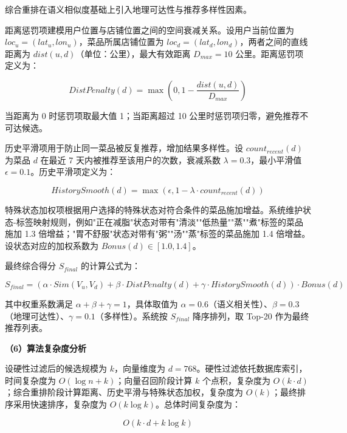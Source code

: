 综合重排在语义相似度基础上引入地理可达性与推荐多样性因素。

距离惩罚项建模用户位置与店铺位置之间的空间衰减关系。设用户当前位置为 $loc_u = (lat_u, lon_u)$，菜品所属店铺位置为 $loc_d = (lat_d, lon_d)$，两者之间的直线距离为 $dist(u, d)$（单位：公里），最大有效距离 $D_{max} = 10$ 公里。距离惩罚项定义为：

\begin{equation}
DistPenalty(d) = \max\left(0, 1 - \frac{dist(u, d)}{D_{max}}\right)
\end{equation}

当距离为 0 时惩罚项取最大值 1；当距离超过 10 公里时惩罚项归零，避免推荐不可达候选。

历史平滑项用于防止同一菜品被反复推荐，增加结果多样性。设 $count_{recent}(d)$ 为菜品 $d$ 在最近 7 天内被推荐至该用户的次数，衰减系数 $\lambda = 0.3$，最小平滑值 $\epsilon = 0.1$。历史平滑项定义为：

\begin{equation}
HistorySmooth(d) = \max\left(\epsilon, 1 - \lambda \cdot count_{recent}(d)\right)
\end{equation}

特殊状态加权项根据用户选择的特殊状态对符合条件的菜品施加增益。系统维护状态-标签映射规则，例如"正在减脂"状态对带有"清淡""低热量""蒸""煮"标签的菜品施加 1.3 倍增益；"胃不舒服"状态对带有"粥""汤""蒸"标签的菜品施加 1.4 倍增益。设状态对应的加权系数为 $Bonus(d) \in [1.0, 1.4]$。

最终综合得分 $S_{final}$ 的计算公式为：

\begin{equation}
S_{final} = \left(\alpha \cdot Sim(V_u, V_d) + \beta \cdot DistPenalty(d) + \gamma \cdot HistorySmooth(d)\right) \cdot Bonus(d)
\end{equation}

其中权重系数满足 $\alpha + \beta + \gamma = 1$，具体取值为 $\alpha = 0.6$（语义相关性）、$\beta = 0.3$（地理可达性）、$\gamma = 0.1$（多样性）。系统按 $S_{final}$ 降序排列，取 Top-20 作为最终推荐列表。

\textbf{（6）算法复杂度分析}

设硬性过滤后的候选规模为 $k$，向量维度为 $d = 768$。硬性过滤依托数据库索引，时间复杂度为 $O(\log n + k)$；向量召回阶段计算 $k$ 个点积，复杂度为 $O(k \cdot d)$；综合重排阶段计算距离、历史平滑与特殊状态加权，复杂度为 $O(k)$；最终排序采用快速排序，复杂度为 $O(k \log k)$。总体时间复杂度为：

\begin{equation}
O(k \cdot d + k \log k)
\end{equation}


